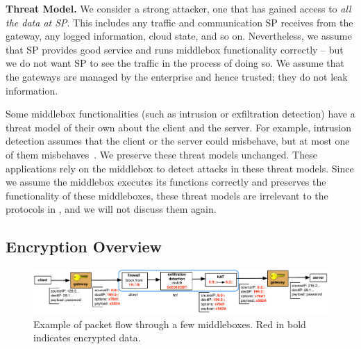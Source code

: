 {\bf Threat Model.}
We consider a strong  attacker, one that has gained access to {\em all the data at SP}.
This includes any traffic and communication SP receives from the 
gateway, any logged information, cloud state, and so on. Nevertheless, we assume that 
SP provides good service and runs middlebox functionality correctly -- but we do not want SP to 
see the traffic in the process of doing so.  
We assume that the gateways are managed by the enterprise and hence trusted; they do not leak information.

Some middlebox functionalities (such as intrusion or exfiltration detection) have a threat model
of their own about the client and the server. For example, intrusion detection assumes that 
the client or the server could misbehave, but at most one of them misbehaves~\cite{Bro}.  
We preserve these threat models unchanged. These applications rely
on the middlebox to detect attacks in these threat models. Since we assume the middlebox executes
its functions correctly and \sys preserves the functionality of these middleboxes, 
these threat models are irrelevant to the protocols in \sys, and we will not discuss them again. 

\subsection{Encryption Overview}

\begin{figure}[t!]
\centering
  \includegraphics[width=6.7in]{fig/packetpath.pdf}
\caption{Example of packet flow through a few middleboxes. Red in bold indicates encrypted data. \label{fig:packetflow}}
\end{figure}



